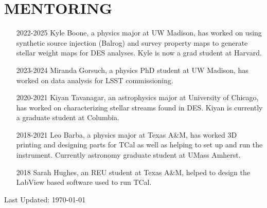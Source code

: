 \documentclass[11pt,letterpaper, sans]{moderncv}        %
\begin{document}
\section{MENTORING}
\begin{itemize} [itemsep=1pt, leftmargin=65pt]
    \item [2022-2025] Kyle Boone, a physics major at UW Madison, has worked on using synthetic source injection (Balrog) and survey property maps to generate stellar weight maps for DES analyses. Kyle is now a grad student at Harvard. 
    \item [2023-2024] Miranda Gorsuch, a physics PhD student at UW Madison, has worked on data analysis for LSST commissioning.
    \item [2020-2021] Kiyan Tavanagar, an astrophysics major at University of Chicago, has worked on characterizing stellar streams found in DES. Kiyan is currently a graduate student at Columbia.   
    \item [2018-2021] Leo Barba, a physics major at Texas A\&M, has worked 3D printing and designing parts for TCal as well as helping to set up and run the instrument. Currently astronomy graduate student at UMass Amherst.  
    \item [2018] Sarah Hughes, an REU student at Texas A\&M, helped to design the LabView based software used to run TCal.  
\end{itemize}

\vfill
\begin{center}
    Last Updated: \monthyeardate\today
\end{center}
{\centering }
% 


\end{document}
